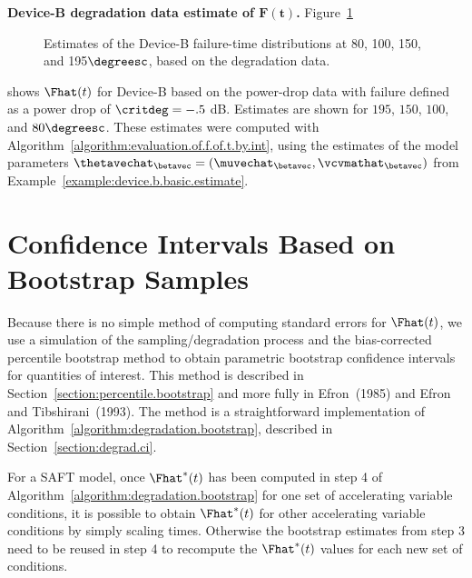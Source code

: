 \begin{example}{\bf Device-B degradation data estimate of $\boldsymbol{F(t)}$.}
\label{example:device.b.degradation.fhat}
Figure~\ref{figure:device.b.comp.deg.m2.cdf.ps}
\begin{figure}
\caption{Estimates of the Device-B failure-time distributions at 80, 100, 150,
and 195$\degreesc$, based on the degradation data.}
\label{figure:device.b.comp.deg.m2.cdf.ps}
\end{figure}
shows $\Fhat(t)$ for Device-B based on the power-drop data with
failure defined as a power drop of $\critdeg = -.5$ dB.  Estimates are
shown for $195$, $150$, $100$, and
$80\degreesc$.  These estimates were computed with
Algorithm~\ref{algorithm:evaluation.of.f.of.t.by.int}, using the
estimates of the model parameters
$\thetavechat_{\betavec}=(\muvechat_{\betavec},
\vcvmathat_{\betavec})$ 
from Example~\ref{example:device.b.basic.estimate}.
\end{example}

\section{Confidence Intervals Based on Bootstrap Samples}
\label{section:adt.bootstrap}

Because there is no simple method of computing standard errors for
$\Fhat(t)$, we use a simulation of the sampling/degradation process
and the bias-corrected percentile bootstrap method to obtain
parametric bootstrap confidence intervals for quantities of
interest. This method is described in
Section~\ref{section:percentile.bootstrap} and more fully in
Efron~(1985) and Efron and Tibshirani~(1993). The method is a
straightforward implementation of
Algorithm~\ref{algorithm:degradation.bootstrap}, described in
Section~\ref{section:degrad.ci}.

For a SAFT model, once $\Fhat^{*}(t)$ has been computed in step 4 of
Algorithm~\ref{algorithm:degradation.bootstrap} for one set of
accelerating variable conditions, it is possible to obtain
$\Fhat^{*}(t)$ for other accelerating variable conditions by simply
scaling times. Otherwise the bootstrap estimates from step 3 need to
be reused in step 4 to recompute the $\Fhat^{*}(t)$ values for each
new set of conditions.

